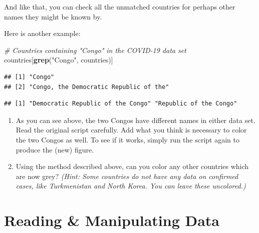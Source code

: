 \documentclass[
]{book}
\newenvironment{Shaded}{\begin{snugshade}}{\end{snugshade}}
\newcommand{\CommentTok}[1]{\textcolor[rgb]{0.56,0.35,0.01}{\textit{#1}}}
\newcommand{\FunctionTok}[1]{\textcolor[rgb]{0.13,0.29,0.53}{\textbf{#1}}}
\newcommand{\NormalTok}[1]{#1}
\newcommand{\SpecialCharTok}[1]{\textcolor[rgb]{0.81,0.36,0.00}{\textbf{#1}}}
\newcommand{\StringTok}[1]{\textcolor[rgb]{0.31,0.60,0.02}{#1}}
\providecommand{\tightlist}{%
  \setlength{\itemsep}{0pt}\setlength{\parskip}{0pt}}
\begin{document}
And like that, you can check all the unmatched countries for perhaps other names they might be known by.

Here is another example:

\begin{Shaded}
\begin{Highlighting}[]
\CommentTok{\# Countries containing "Congo" in the COVID{-}19 data set}
\NormalTok{countries[}\FunctionTok{grep}\NormalTok{(}\StringTok{"Congo"}\NormalTok{, countries)]}
\end{Highlighting}
\end{Shaded}

\begin{verbatim}
## [1] "Congo"                                
## [2] "Congo, the Democratic Republic of the"
\end{verbatim}

\begin{Shaded}
\end{Shaded}

\begin{verbatim}
## [1] "Democratic Republic of the Congo" "Republic of the Congo"
\end{verbatim}

\begin{enumerate}
\def\labelenumi{\arabic{enumi}.}
\tightlist
\item
  As you can see above, the two Congos have different names in either data set. Read the original script carefully. Add what you think is necessary to color the two Congos as well. To see if it works, simply run the script again to produce the (new) figure.
\item
  Using the method described above, can you color any other countries which are now grey? \emph{(Hint: Some countries do not have any data on confirmed cases, like Turkmenistan and North Korea. You can leave these uncolored.)}
\end{enumerate}

\hypertarget{data-manipulation}{%
\chapter{Reading \& Manipulating Data}\label{data-manipulation}}
\end{document}
